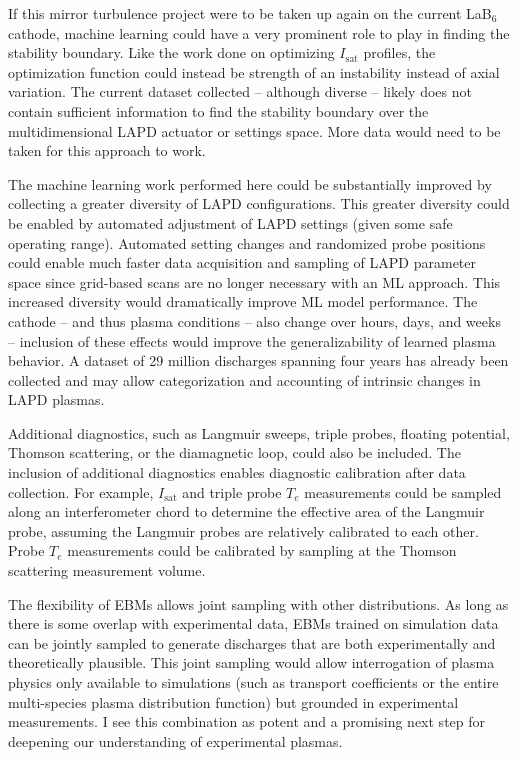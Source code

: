 If this mirror turbulence project were to be taken up again on the current LaB$_6$ cathode, machine learning could have a very prominent role to play in finding the stability boundary. Like the work done on optimizing $I_\text{sat}$ profiles, the optimization function could instead be strength of an instability instead of axial variation. The current dataset collected -- although diverse -- likely does not contain sufficient information to find the stability boundary over the multidimensional LAPD actuator or settings space. More data would need to be taken for this approach to work.

The machine learning work performed here could be substantially improved by collecting a greater diversity of LAPD configurations. This greater diversity could be enabled by automated adjustment of LAPD settings (given some safe operating range). Automated setting changes and randomized probe positions could enable much faster data acquisition and sampling of LAPD parameter space since grid-based scans are no longer necessary with an ML approach. This increased diversity would dramatically improve ML model performance. The cathode -- and thus plasma conditions -- also change over hours, days, and weeks -- inclusion of these effects would improve the generalizability of learned plasma behavior. A dataset of 29 million discharges spanning four years has already been collected and may allow categorization and accounting of intrinsic changes in LAPD plasmas.

Additional diagnostics, such as Langmuir sweeps, triple probes, floating potential, Thomson scattering, or the diamagnetic loop, could also be included. The inclusion of additional diagnostics enables diagnostic calibration after data collection. For example, $I_\text{sat}$ and triple probe $T_e$ measurements could be sampled along an interferometer chord to determine the effective area of the Langmuir probe, assuming the Langmuir probes are relatively calibrated to each other. Probe $T_e$ measurements could be calibrated by sampling at the Thomson scattering measurement volume. 

The flexibility of EBMs allows joint sampling with other distributions. As long as there is some overlap with experimental data, EBMs trained on simulation data can be jointly sampled to generate discharges that are both experimentally and theoretically plausible. This joint sampling would allow interrogation of plasma physics only available to simulations (such as transport coefficients or the entire multi-species plasma distribution function) but grounded in experimental measurements. I see this combination as potent and a promising next step for deepening our understanding of experimental plasmas.

